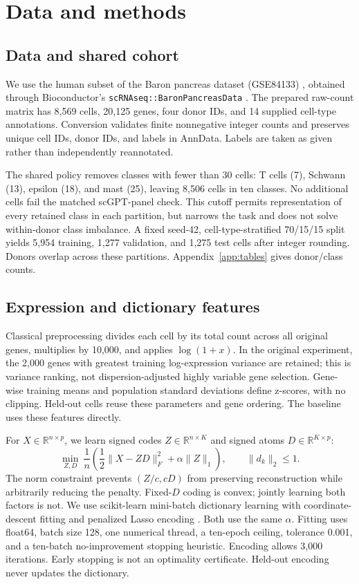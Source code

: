 \section{Data and methods}
\subsection{Data and shared cohort}
We use the human subset of the Baron pancreas dataset (GSE84133)
\cite{baron2016}, obtained through Bioconductor's
\texttt{scRNAseq::BaronPancreasData} \cite{scrnaseq}. The prepared raw-count
matrix has 8,569 cells, 20,125 genes, four donor IDs, and 14 supplied cell-type
annotations. Conversion validates finite nonnegative integer counts and
preserves unique cell IDs, donor IDs, and labels in AnnData. Labels are taken
as given rather than independently reannotated.

The shared policy removes classes with fewer than 30 cells: T cells (7),
Schwann (13), epsilon (18), and mast (25), leaving 8,506 cells in ten classes.
No additional cells fail the matched scGPT-panel check. This cutoff permits
representation of every retained class in each partition, but narrows the
task and does not solve within-donor class imbalance. A fixed seed-42,
cell-type-stratified 70/15/15 split yields 5,954 training, 1,277 validation,
and 1,275 test cells after integer rounding. Donors overlap across these
partitions. Appendix~\ref{app:tables} gives donor/class counts.

\subsection{Expression and dictionary features}
Classical preprocessing divides each cell by its total count across all
original genes, multiplies by 10,000, and applies $\log(1+x)$. In the original
experiment, the 2,000 genes with greatest training log-expression variance
are retained; this is variance ranking, not dispersion-adjusted highly
variable gene selection. Gene-wise training means and population standard
deviations define z-scores, with no clipping. Held-out cells reuse these
parameters and gene ordering. The baseline uses these features directly.

For $X\in\mathbb R^{n\times p}$, we learn signed codes
$Z\in\mathbb R^{n\times K}$ and signed atoms $D\in\mathbb R^{K\times p}$:
\begin{equation}
 \min_{Z,D}\ \frac1n\left(\frac12\|X-ZD\|_F^2+\alpha\|Z\|_1\right),
 \qquad \|d_k\|_2\le1.
 \label{eq:dictionary}
\end{equation}
The norm constraint prevents $(Z/c,cD)$ from preserving reconstruction while
arbitrarily reducing the penalty. Fixed-$D$ coding is convex; jointly learning
both factors is not. We use scikit-learn mini-batch dictionary learning with
coordinate-descent fitting and penalized Lasso encoding \cite{sklearn}.
Both use the same $\alpha$. Fitting uses float64, batch size 128, one numerical
thread, a ten-epoch ceiling, tolerance 0.001, and a ten-batch no-improvement
stopping heuristic. Encoding allows 3,000 iterations. Early stopping is not
an optimality certificate. Held-out encoding never updates the dictionary.


